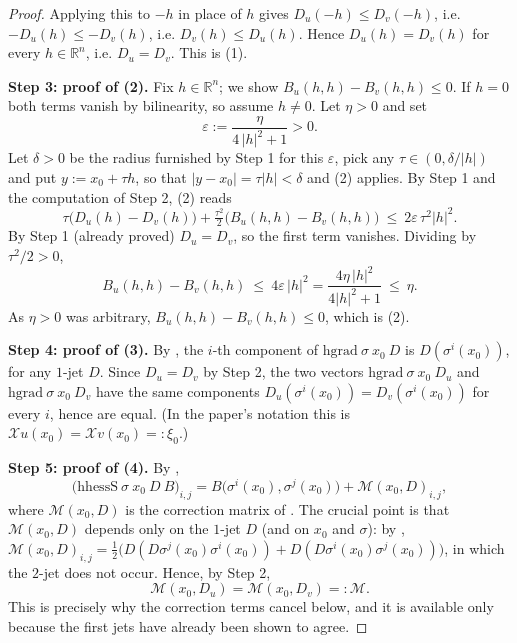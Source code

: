 \begin{proof}
Applying this to $-h$ in place of $h$ gives $D_u(-h)\le D_v(-h)$, i.e.
$-D_u(h)\le-D_v(h)$, i.e. $D_v(h)\le D_u(h)$. Hence $D_u(h)=D_v(h)$ for every
$h\in\mathbb R^{n}$, i.e. $D_u=D_v$. This is (1).

\medskip\noindent\textbf{Step 3: proof of (2).} Fix $h\in\mathbb R^{n}$; we show
$B_u(h,h)-B_v(h,h)\le0$. If $h=0$ both terms vanish by bilinearity, so assume $h\ne0$. Let
$\eta>0$ and set
\[
 \varepsilon:=\frac{\eta}{4\,|h|^{2}+1}>0 .
\]
Let $\delta>0$ be the radius furnished by Step 1 for this $\varepsilon$, pick any
$\tau\in(0,\delta/|h|)$ and put $y:=x_0+\tau h$, so that $|y-x_0|=\tau|h|<\delta$ and (2)
applies. By Step 1 and the computation of Step 2, (2) reads
\[
 \tau\big(D_u(h)-D_v(h)\big)+\tfrac{\tau^{2}}2\big(B_u(h,h)-B_v(h,h)\big)
 \ \le\ 2\varepsilon\,\tau^{2}|h|^{2} .
\]
By Step 1 (already proved) $D_u=D_v$, so the first term vanishes. Dividing by
$\tau^{2}/2>0$,
\[
 B_u(h,h)-B_v(h,h)\ \le\ 4\varepsilon\,|h|^{2}
  =\frac{4\eta\,|h|^{2}}{4|h|^{2}+1}\ \le\ \eta .
\]
As $\eta>0$ was arbitrary, $B_u(h,h)-B_v(h,h)\le0$, which is (2).

\medskip\noindent\textbf{Step 4: proof of (3).} By , the $i$-th component of
$\mathrm{hgrad}\ \sigma\ x_0\ D$ is $D(\sigma^{i}(x_0))$, for any $1$-jet $D$. Since
$D_u=D_v$ by Step 2, the two vectors
$\mathrm{hgrad}\ \sigma\ x_0\ D_u$ and $\mathrm{hgrad}\ \sigma\ x_0\ D_v$ have the same
components $D_u(\sigma^{i}(x_0))=D_v(\sigma^{i}(x_0))$ for every $i$, hence are equal. (In
the paper's notation this is $\mathcal Xu(x_0)=\mathcal Xv(x_0)=:\xi_0$.)

\medskip\noindent\textbf{Step 5: proof of (4).} By ,
\[
 \big(\mathrm{hhessS}\ \sigma\ x_0\ D\ B\big)_{i,j}
  =B\big(\sigma^{i}(x_0),\sigma^{j}(x_0)\big)+\mathcal M(x_0,D)_{i,j},
\]
where $\mathcal M(x_0,D)$ is the correction matrix of . The crucial point is
that $\mathcal M(x_0,D)$ depends only on the $1$-jet $D$ (and on $x_0$ and $\sigma$): by
,
$\mathcal M(x_0,D)_{i,j}=\tfrac12\big(D(D\sigma^{j}(x_0)\sigma^{i}(x_0))
+D(D\sigma^{i}(x_0)\sigma^{j}(x_0))\big)$, in which the $2$-jet does not occur. Hence, by
Step 2,
\[
 \mathcal M(x_0,D_u)=\mathcal M(x_0,D_v)=:\mathcal M . \tag{4}
\]
This is precisely why the correction terms cancel below, and it is available only because the
first jets have already been shown to agree.


\end{proof}
